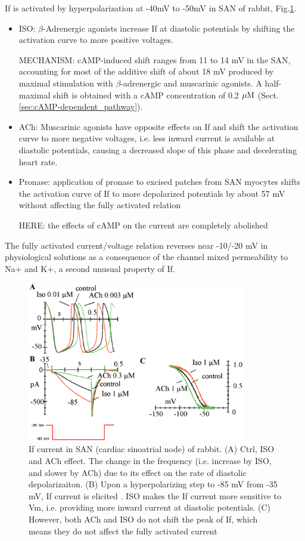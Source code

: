 If is activated by hyperpolarization at -40mV to -50mV in SAN of rabbit,
Fig.\ref{fig:If_SAN}. 
\begin{itemize}
  
  \item  ISO: $\beta$-Adrenergic agonists increase If at diastolic potentials by
  shifting the activation curve to more positive voltages.
  
MECHANISM:  cAMP-induced shift ranges from 11 to 14 mV in the SAN, accounting
for most of the additive shift of about 18 mV produced by maximal stimulation
with $\beta$-adrenergic and muscarinic agonists.
A half-maximal shift is obtained with a cAMP concentration of 0.2 ${\mu\text{M}}$
(Sect.\ref{sec:cAMP-dependent_pathway}).

  \item ACh: Muscarinic agonists have opposite effects on
If and shift the activation curve to more negative voltages, i.e. less inward
current is available at diastolic potentials, causing a decreased slope of this
phase and decelerating heart rate.

  \item Pronase: application of
pronase to excised patches from SAN myocytes shifts the activation curve of If
to more depolarized potentials by about 57 mV without affecting the fully
activated relation

HERE: the effects of cAMP on the current are completely abolished

\end{itemize}
The fully activated current/voltage relation
reverses near -10/-20 mV in physiological solutions as a consequence
of the channel mixed permeability to Na+ and K+, a
second unusual property of If. 

\begin{figure}[hbt]
 \centerline{\includegraphics[height=7cm]{./images/If_SAN.eps}}
\caption{If current in SAN (cardiac sinoatrial node) of rabbit. (A) Ctrl, ISO
and ACh effect. The change in the frequency (i.e. increase by ISO, and slower by
ACh) due to its effect on the rate of diastolic depolarizaiton. (B) Upon a
hyperpolarizing step to -85 mV from -35 mV, If current is elicited . ISO makes
the If current more sensitive to Vm, i.e. providing more inward current at
diastolic potentials. (C) However, both ACh and ISO do not shift the peak of If,
which means they do not affect the fully activated current}
\label{fig:If_SAN}
\end{figure}

